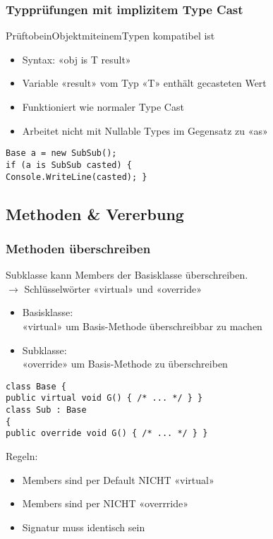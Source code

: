 \subsubsection{Typprüfungen mit implizitem Type Cast}
PrüftobeinObjektmiteinemTypen kompatibel ist
\begin{itemize}
    \item Syntax: «obj is T result»
    \item Variable «result» vom Typ «T» enthält gecasteten Wert
    \item Funktioniert wie normaler Type Cast
    \item Arbeitet nicht mit Nullable Types im Gegensatz zu «as»
\end{itemize}
\begin{lstlisting}
Base a = new SubSub();
if (a is SubSub casted) {
Console.WriteLine(casted); }
\end{lstlisting}


\subsection{Methoden \& Vererbung}
\subsubsection{Methoden überschreiben}
Subklasse kann Members der Basisklasse überschreiben.\\
$\rightarrow$ Schlüsselwörter «virtual» und «override»

\begin{itemize}
    \item Basisklasse:\\
    «virtual» um Basis-Methode überschreibbar zu machen
    \item Subklasse:\\
    «override» um Basis-Methode zu überschreiben
\end{itemize}
\begin{lstlisting}
class Base {
public virtual void G() { /* ... */ } }
class Sub : Base
{
public override void G() { /* ... */ } }
\end{lstlisting}
Regeln:
\begin{itemize}
    \item Members sind per Default NICHT «virtual»
    \item Members sind per NICHT «overrride»
    \item Signatur muss identisch sein
\end{itemize}

